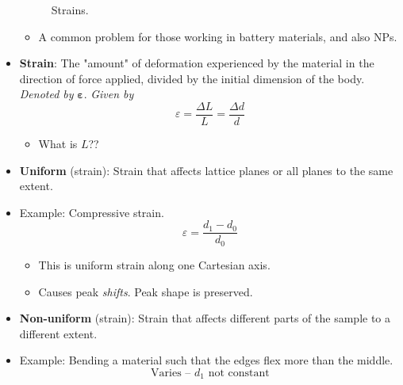 \documentclass[../notes.tex]{subfiles}
\begin{document}
\begin{itemize}
\begin{figure}[H]
        \caption{Strains.}
        \label{fig:strains}
    \end{figure}
    \begin{itemize}
        \item A common problem for those working in battery materials, and also NPs.
    \end{itemize}
    \item \textbf{Strain}: The "amount" of deformation experienced by the material in the direction of force applied, divided by the initial dimension of the body. \emph{Denoted by} $\bm{\varepsilon}$. \emph{Given by}
    \begin{equation*}
        \varepsilon = \frac{\Delta L}{L}
        = \frac{\Delta d}{d}
    \end{equation*}
    \begin{itemize}
        \item What is $L$??
    \end{itemize}
    \item \textbf{Uniform} (strain): Strain that affects lattice planes or all planes to the same extent.
    \item Example: Compressive strain.
    \begin{equation*}
        \varepsilon = \frac{d_1-d_0}{d_0}
    \end{equation*}
    \begin{itemize}
        \item This is uniform strain along one Cartesian axis.
        \item Causes peak \emph{shifts}. Peak shape is preserved.
    \end{itemize}
    \item \textbf{Non-uniform} (strain): Strain that affects different parts of the sample to a different extent.
    \item Example: Bending a material such that the edges flex more than the middle.
    \begin{equation*}
        \text{Varies -- }d_1\text{ not constant}

\end{equation*}
\end{itemize}
\end{document}
